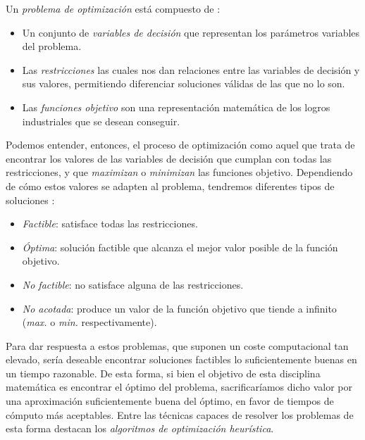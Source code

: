 \documentclass[12pt,a4paper]{book}
\begin{document}
Un \textsl{problema de optimización} está compuesto de \cite{e_besada_optimizacion_nodate}: 
\begin{itemize}
	\item Un conjunto de \textsl{variables de decisión} que representan los parámetros variables del problema.  
	\item Las \textsl{restricciones} las cuales nos dan relaciones entre las variables de decisión y sus valores, permitiendo diferenciar soluciones válidas de las que no lo son.   
	\item Las \textsl{funciones objetivo} son una representación matemática de los logros industriales que se desean conseguir.
\end{itemize}

Podemos entender, entonces, el proceso de optimización como aquel que trata de encontrar los valores de las variables de decisión que cumplan con todas las restricciones, y que \textsl{maximizan} o \textsl{minimizan} las funciones objetivo. Dependiendo de cómo estos valores se adapten al problema, tendremos diferentes tipos de soluciones \cite{e_besada_optimizacion_nodate}:
 
\begin{itemize}
	\item \textsl{Factible}: satisface todas las restricciones.
	\item \textsl{Óptima}: solución factible que alcanza el mejor valor posible de la función objetivo.
	\item \textsl{No factible}: no satisface alguna de las restricciones.
	\item \textsl{No acotada}: produce un valor de la función objetivo que tiende a infinito (\textsl{max.} o \textsl{min.} respectivamente).
\end{itemize}

Para dar respuesta a estos problemas, que suponen un coste computacional tan elevado, sería deseable encontrar soluciones factibles lo suficientemente buenas en un tiempo razonable. De esta forma, si bien el objetivo de esta disciplina matemática es encontrar el óptimo del problema, sacrificaríamos dicho valor por una aproximación suficientemente buena del óptimo, en favor de tiempos de cómputo más aceptables. Entre las técnicas capaces de resolver los problemas de esta forma destacan los \textsl{algoritmos de optimización heurística}. 
\end{document}

